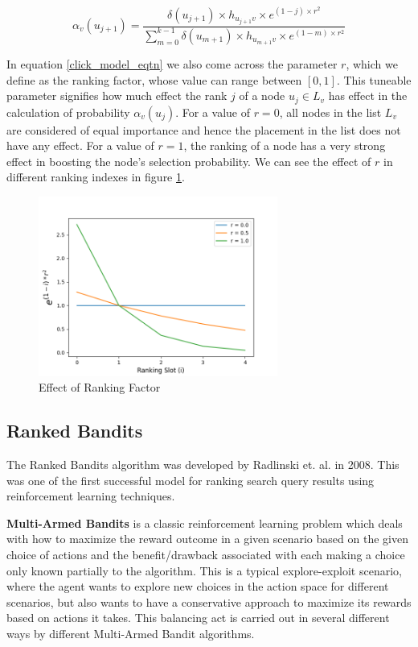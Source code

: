\begin{equation}
\label{click_model_eqtn}
\alpha_{v}(u_{j+1}) = \frac{\delta(u_{j+1}) \times h_{u_{j+1}v} \times e^{(1-j)\times r^{2}}}{\sum_{m=0}^{k-1} \delta(u_{m+1}) \times h_{u_{m+1}v} \times e^{(1-m)\times r^{2}}}
\end{equation} 

In equation \ref{click_model_eqtn} we also come across the parameter $r$, which we define as the ranking factor, whose value can range between $[0,1]$. This tuneable parameter signifies how much effect the rank $j$ of a node $u_{j} \in L_{v}$ has effect in the calculation of probability $\alpha_{v}(u_{j})$. For a value of $r=0$, all nodes in the list $L_{v}$ are considered of equal importance and hence the placement in the list does not have any effect. For a value of $r=1$, the ranking of a node has a very strong effect in boosting the node's selection probability. We can see the effect of $r$ in different ranking indexes in figure \ref{ranking_factor_fig}.

\begin{figure}[h]
	\centering
	\includegraphics[width=0.7\textwidth]{images/ranking_factor.png}
	\caption{Effect of Ranking Factor}
	\label{ranking_factor_fig}
\end{figure}

\subsection{Ranked Bandits}

The Ranked Bandits algorithm \cite{radlinski2008learning} was developed by Radlinski et. al. in 2008. This was one of the first successful model for ranking search query results using reinforcement learning techniques. 

\textbf{Multi-Armed Bandits} is a classic reinforcement learning problem which deals with how to maximize the reward outcome in a given scenario based on the given choice of actions and the benefit/drawback associated with each making a choice only known partially to the algorithm. This is a typical explore-exploit scenario, where the agent wants to explore new choices in the action space for different scenarios, but also wants to have a conservative approach to maximize its rewards based on actions it takes. This balancing act is carried out in several different ways by different Multi-Armed Bandit algorithms.

